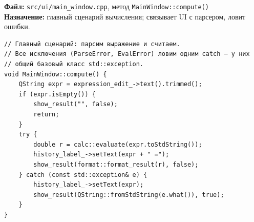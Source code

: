 



\noindent\textbf{Файл:} \texttt{src/ui/main\_window.cpp}, метод \texttt{MainWindow::compute()}\\
\textbf{Назначение:} главный сценарий вычисления; связывает UI с парсером, ловит ошибки.

\begin{lstlisting}
// Главный сценарий: парсим выражение и считаем.
// Все исключения (ParseError, EvalError) ловим одним catch — у них
// общий базовый класс std::exception.
void MainWindow::compute() {
    QString expr = expression_edit_->text().trimmed();
    if (expr.isEmpty()) {
        show_result("", false);
        return;
    }
    try {
        double r = calc::evaluate(expr.toStdString());
        history_label_->setText(expr + " =");
        show_result(format::format_result(r), false);
    } catch (const std::exception& e) {
        history_label_->setText(expr);
        show_result(QString::fromStdString(e.what()), true);
    }
}
\end{lstlisting}


